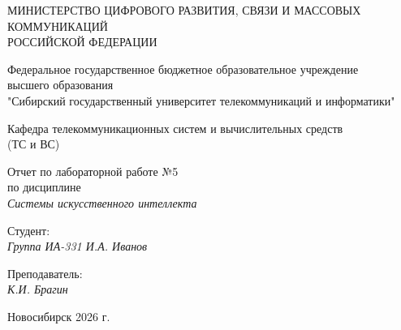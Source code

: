 \thispagestyle{empty}

\begin{center}
    МИНИСТЕРСТВО ЦИФРОВОГО РАЗВИТИЯ, СВЯЗИ И МАССОВЫХ КОММУНИКАЦИЙ \\ РОССИЙСКОЙ ФЕДЕРАЦИИ
    
    \vspace{20pt}
    
    Федеральное государственное бюджетное образовательное учреждение \\ высшего образования \\
    "Сибирский государственный университет телекоммуникаций и информатики" \\
    
    \vspace{20pt}
    
    Кафедра телекоммуникационных систем и вычислительных средств \\ (ТС и ВС)
\end{center}

\vfill

\begin{center}
    Отчет по лабораторной работе №5 \\
    по дисциплине \\
    \textit{Системы искусственного интеллекта}
    \vspace{20pt}
\end{center}

\vfill

\noindent Студент: \\
\textit{Группа ИА-331 \hfill И.А. Иванов}

\vspace{20pt}

\vspace{20pt}

\noindent Преподаватель: \\
\textit{\hfill К.И. Брагин}

\vfill

\begin{center}
    Новосибирск 2026 г.
\end{center}
